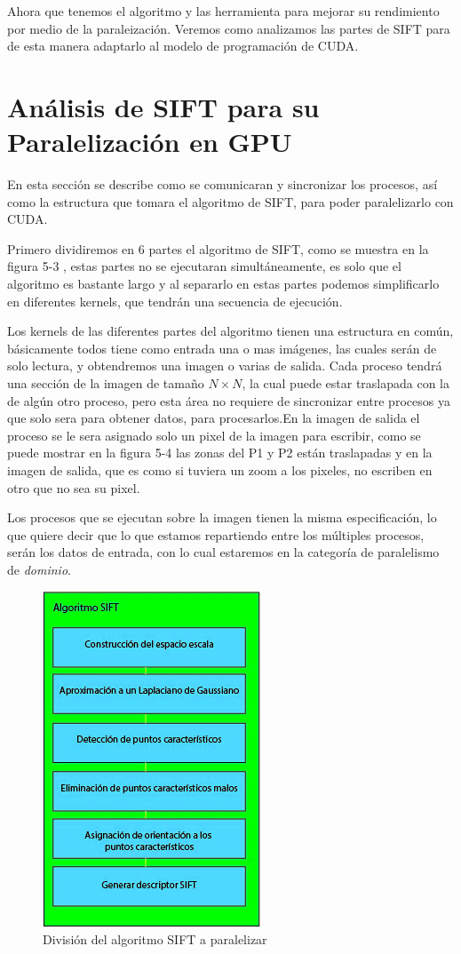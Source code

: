 Ahora que tenemos el algoritmo y las herramienta para mejorar su rendimiento por medio de la paraleización. Veremos como analizamos las partes de SIFT para de esta manera adaptarlo al modelo de programación de CUDA.
\pagebreak
\section{Análisis de SIFT para su Paralelización en GPU}

En esta sección se describe como se comunicaran y sincronizar los procesos, así como la estructura que tomara el algoritmo de SIFT, para poder paralelizarlo con CUDA. 

Primero dividiremos en 6 partes el algoritmo de SIFT, como se muestra en la figura 5-3 , estas partes no se ejecutaran simultáneamente, es solo que el algoritmo es bastante largo y al separarlo en estas partes podemos simplificarlo en diferentes kernels, que tendrán una secuencia de ejecución. 


Los kernels de las diferentes partes del algoritmo tienen una estructura en común, básicamente todos tiene como entrada una o mas imágenes, las cuales serán de solo lectura, y obtendremos una imagen o varias de salida. Cada proceso tendrá una sección de la imagen de tamaño  $N \times N$, la cual puede estar traslapada con la de algún otro proceso, pero esta área no requiere de sincronizar entre procesos ya que solo sera para obtener datos, para procesarlos.En la imagen de salida el proceso se le sera asignado solo un pixel de la imagen para escribir, como se puede mostrar en la figura 5-4 las zonas del P1 y P2 están traslapadas y en la imagen de salida, que es como si tuviera un zoom a los pixeles, no escriben en otro que no sea su pixel. 

\pagebreak
Los procesos que se ejecutan sobre la imagen tienen la misma especificación, lo que quiere decir que lo que estamos repartiendo entre los múltiples procesos, serán los datos de entrada, con lo cual estaremos en la categoría de paralelismo de \textit{dominio}.

\begin{figure}[ph]
			\centering
				\includegraphics[scale=1]{img/SIFTdiv.jpg}
			\caption{División del algoritmo SIFT a paralelizar}
\end{figure}


